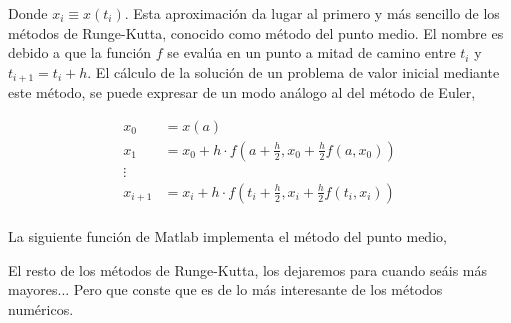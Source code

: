 \begin{paracol}{2}
Donde $x_i\equiv x(t_i)$. Esta aproximación da lugar al primero y más sencillo de los métodos de Runge-Kutta, conocido como método del punto medio. El nombre es debido a que la función $f$ se evalúa en un punto a mitad de camino entre $t_i$ y $t_{i+1}=t_i+h$. El cálculo de la solución de un problema de valor inicial mediante este método, se puede expresar de un modo análogo al del método de Euler,
\end{paracol} 
\begin{align*}
x_0&=x(a)\\
x_1&=x_0+h\cdot f(a+\frac{h}{2},x_0+\frac{h}{2}f(a,x_0))\\
\vdots \\
x_{i+1}&=x_i+h\cdot f(t_i+\frac{h}{2},x_i+\frac{h}{2}f(t_i,x_i))\\
\end{align*}
\begin{paracol}{2}
La siguiente función de Matlab implementa el método del punto medio,
\end{paracol}
%
\begin{paracol}{2}
El resto de los métodos de Runge-Kutta, los dejaremos para cuando seáis más mayores... Pero que conste que es de lo más interesante de los métodos numéricos.
\end{paracol}

